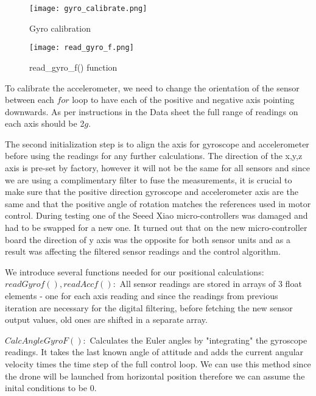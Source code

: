 \begin{flushleft}
\begin{figure}[H]
    \begin{center}
    \texttt{[image: gyro\_calibrate.png]}
    \end{center}
    \caption{Gyro calibration}
    \label{fig:my_label}
\end{figure}

\begin{figure}[H]
    \begin{center}
    \texttt{[image: read\_gyro\_f.png]}
    \end{center}
    \caption{read_gyro_f() function}
    \label{fig:my_label}
\end{figure}

\begin{flushleft}
To calibrate the accelerometer, we need to change the orientation of the sensor between each $for$ loop to have each of the positive and negative axis pointing downwards. As per instructions in the Data sheet the full range of readings on each axis should be 2$g$. 

The second initialization step is to align the axis for gyroscope and accelerometer before using the readings for any further calculations.
The direction of the x,y,z axis is pre-set by factory, however it will not be the same for all sensors and since we are using a complimentary filter to fuse the measurements, it is crucial to make sure that the positive direction gyroscope and accelerometer axis are the same and that the positive angle of rotation matches the references used in motor control. \newline
During testing one of the Seeed Xiao micro-controllers was damaged and had to be swapped for a new one. It turned out that on the new micro-controller board the direction of y axis was the opposite for both sensor units and as a result was affecting the filtered sensor readings and the control algorithm. \newline

We introduce several functions needed for our positional calculations:
$readGyrof(), readAccf():$\newline
All sensor readings are stored in arrays of 3 float elements - one for each axis reading and since the readings from previous iteration are necessary for the digital filtering, before fetching the new sensor output values, old ones are shifted in a separate array.

$CalcAngleGyroF():$\newline
Calculates the Euler angles by "integrating" the gyroscope readings. It takes the last known angle of attitude and adds the current angular velocity times the time step of the full control loop. We can use this method since the drone will be launched from horizontal position therefore we can assume the inital conditions to be 0.


\end{flushleft}
\end{flushleft}
